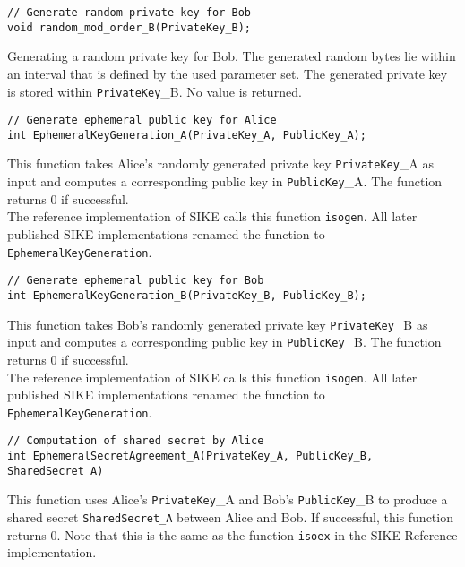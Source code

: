 \begin{lstlisting}[]
// Generate random private key for Bob
void random_mod_order_B(PrivateKey_B);
\end{lstlisting}
Generating a random private key for Bob. The generated random bytes lie within an interval that is defined by the used parameter set. The generated private key is stored within \textcolor{keywordcol}{\texttt{PrivateKey}\_B}. No value is returned.\\

\begin{lstlisting}[]
// Generate ephemeral public key for Alice
int EphemeralKeyGeneration_A(PrivateKey_A, PublicKey_A);
\end{lstlisting}
This function takes Alice's randomly generated private key \textcolor{keywordcol}{\texttt{PrivateKey}\_A} as input and computes a corresponding public key in \textcolor{keywordcol}{\texttt{PublicKey}\_A}. The function returns 0 if successful.\\
The reference implementation of SIKE calls this function \texttt{isogen}. All later published SIKE implementations renamed the function to \texttt{EphemeralKeyGeneration}.\\

\begin{lstlisting}[]
// Generate ephemeral public key for Bob
int EphemeralKeyGeneration_B(PrivateKey_B, PublicKey_B);
\end{lstlisting}
This function takes Bob's randomly generated private key \textcolor{keywordcol}{\texttt{PrivateKey}\_B} as input and computes a corresponding public key in \textcolor{keywordcol}{\texttt{PublicKey}\_B}. The function returns 0 if successful.\\
The reference implementation of SIKE calls this function \texttt{isogen}. All later published SIKE implementations renamed the function to \texttt{EphemeralKeyGeneration}.\\

\begin{lstlisting}[]
// Computation of shared secret by Alice
int EphemeralSecretAgreement_A(PrivateKey_A, PublicKey_B, SharedSecret_A)
\end{lstlisting}
This function uses Alice's \textcolor{keywordcol}{\texttt{PrivateKey}\_A} and Bob's \textcolor{keywordcol}{\texttt{PublicKey}\_B} to produce a shared secret \textcolor{keywordcol}{\texttt{SharedSecret\_A}} between Alice and Bob. If successful, this function returns 0. 
Note that this is the same as the function \texttt{isoex} in the SIKE Reference implementation.\\

